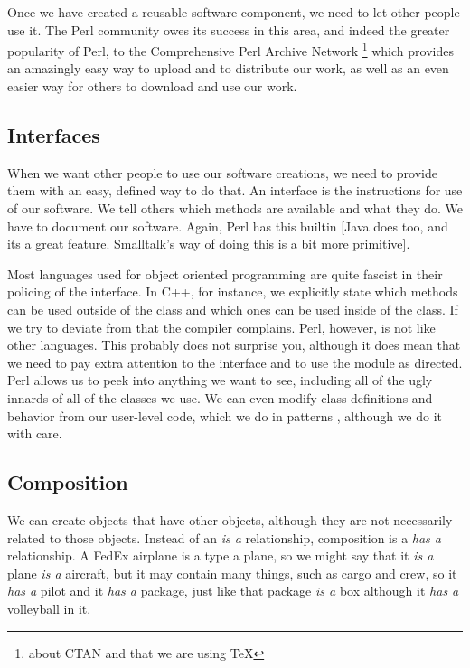 Once we have created a reusable software component, we need to
let other people use it.  The Perl community owes its success
in this area, and indeed the greater popularity of Perl, to  the
Comprehensive Perl Archive Network \footnote{about CTAN and that
we are using \TeX} which provides an amazingly easy way to upload
and to distribute our work, as well as an even easier way for
others to download and use our work.

        \subsection{Interfaces}

When we want other people to use our software creations, we need
to provide them with an easy, defined way to do that.  An interface
is the instructions for use of our software.  We tell others which
methods are available and what they do.  We have to document our
software.  Again, Perl has this builtin [Java does too, and its
a great feature.  Smalltalk's way of doing this is a bit more
primitive].

Most languages used for object oriented programming are quite
fascist in their policing of the interface.  In C++, for instance,
we explicitly state which methods can be used outside of the class
and which ones can be used inside of the class.  If we try to
deviate from that the compiler complains.  Perl, however, is not
like other languages.  This probably does not surprise you, although
it does mean that we need to pay extra attention to the interface
and to use the module as directed.  Perl allows us to peek into
anything we want to see, including all of the ugly innards of all
of the classes we use.  We can even modify class definitions
and behavior from our user-level code, which we do in patterns
, although we do it with care.

        \subsection{Composition}

We can create objects that have other objects, although they
are not necessarily related to those objects.   Instead of 
an {\it is a \/} relationship, composition is a {\it has a}
relationship.  A FedEx airplane is a type a plane, so we
might say that it {\it is a \/} plane {\it is a \/} aircraft, but
it may contain many things, such as cargo and crew, so it {\it has a}
pilot and it {\it has a} package, just like that package {\it is a \/}
box although it {\it has a} volleyball in it.

